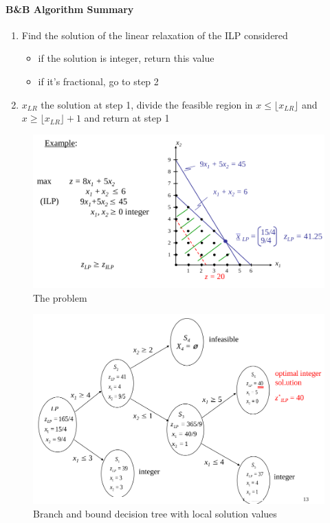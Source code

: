 \documentclass{article}
\begin{document}
				\paragraph{B\&B Algorithm Summary}
					\begin{enumerate}
						\item Find the solution of the linear relaxation of the ILP considered
							\begin{itemize}
								\item if the solution is integer, return this value
								\item if it's fractional, go to step 2
							\end{itemize}
						\item $x_{LR}$ the solution at step 1, divide the feasible region in $x \leq \lfloor x_{LR} \rfloor$ and $x \geq \lfloor x_{LR} \rfloor + 1$ and return at step 1
					\end{enumerate}
					\begin{minipage}{0.5\linewidth}
						\begin{figure}[H]
							\centering
							\includegraphics[width = \textwidth]{./images/BaB1.png}
							\caption{The problem}
						\end{figure}
					\end{minipage}
					\begin{minipage}{0.5\linewidth}
						\begin{figure}[H]
							\centering
							\includegraphics[width = \textwidth]{./images/BaB2.png}
							\caption{Branch and bound decision tree with local solution values}
						\end{figure}
					\end{minipage}
					\vspace{0.5cm}
					
\end{document}
